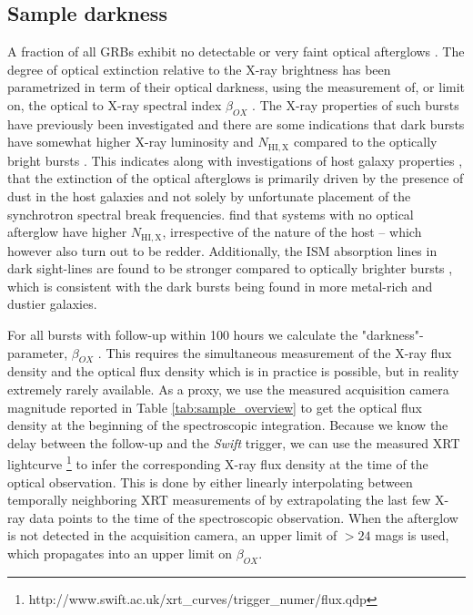 \documentclass{aa}    %
\begin{document}
\subsection{Sample darkness} \label{darkness}

A fraction of all GRBs exhibit no detectable or very faint optical afterglows
\citep{Groot1998, Djorgovski2001, Fynbo2001}. The degree of optical extinction
relative to the X-ray brightness has been parametrized in term of their optical
darkness, using the measurement of, or limit on, the optical to X-ray spectral
index $\beta_{OX}$ \citep{Jakobsson2004, Rol2005, VanderHorst2009}. The X-ray
properties of such bursts have previously been investigated
\citep{DePasquale2003, Fynbo2009, Melandri2012} and there are some indications
that dark bursts have somewhat higher X-ray luminosity and $N_{\mathrm{HI, X}}$
compared to the optically bright bursts \citep{Campana2012}. This indicates
along with investigations of host galaxy properties \citep{Greiner2011,
	Kruhler2011, Hjorth2012, Perley2016b}, that the extinction of the optical
afterglows is primarily driven by the presence of dust in the host galaxies and
not solely by unfortunate placement of the synchrotron spectral break
frequencies. \citet{Hjorth2012} find that systems with no optical afterglow have
higher $N_{\mathrm{HI, X}}$, irrespective of the nature of the host -- which
however also turn out to be redder. Additionally, the ISM absorption lines in
dark sight-lines are found to be stronger compared to optically brighter bursts
\citep{Christensen2011a}, which is consistent with the dark bursts being found
in more metal-rich and dustier galaxies.

For all bursts with follow-up within 100 hours we calculate the
"darkness"-parameter, $\beta_{OX}$ \citep{Jakobsson2004}. This requires the
simultaneous measurement of the X-ray flux density and the optical flux density
which is in practice is possible, but in reality extremely rarely available. As
a proxy, we use the measured acquisition camera magnitude reported in Table
\ref{tab:sample_overview} to get the optical flux density at the beginning of
the spectroscopic integration. Because we know the delay between the follow-up
and the \textit{Swift} trigger, we can use the measured XRT lightcurve
\citep{Evans2007,
	Evans2009}\footnote{http://www.swift.ac.uk/xrt\_curves/trigger\_numer/flux.qdp}
to infer the corresponding X-ray flux density at the time of the optical
observation. This is done by either linearly interpolating between temporally
neighboring XRT measurements of by extrapolating the last few X-ray data points
to the time of the spectroscopic observation. When the afterglow is not detected
in the acquisition camera, an upper limit of $> 24$ mags is used, which
propagates into an upper limit on $\beta_{OX}$.
\end{document}
